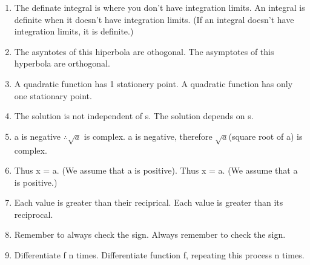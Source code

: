 \documentclass[11pt]{article}
\begin{document}
\begin{enumerate}
	\item
	The definate integral is where you don't have integration limits. \textrightarrow \hspace*{0.25cm} An integral is definite when it doesn't have integration limits.
	(If an integral doesn't have integration limits, it is definite.) 
	\item
	The asyntotes of this hiperbola are othogonal. \textrightarrow \hspace*{0.25cm} The asymptotes of this hyperbola are orthogonal.
	\item
	A quadratic function has 1 stationery point. \textrightarrow \hspace*{0.25cm} A quadratic function has only one stationary point.
	\item
	The solution is not independent of s. \textrightarrow \hspace*{0.25cm} The solution depends on s.
	\item
	a is negative $\therefore\sqrt{a}$ is complex. \textrightarrow \hspace*{0.25cm} a is negative, therefore $\sqrt{a}$(square root of a) is complex. 
	\item
	Thus x = a. (We assume that a is positive). \textrightarrow \hspace*{0.25cm} Thus x = a. (We assume that a is positive.)
	\item
	Each value is greater than their reciprical. \textrightarrow \hspace*{0.25cm} Each value is greater than its reciprocal.
	\item
	Remember to always check the sign. \textrightarrow \hspace*{0.25cm} Always remember to check the sign.
	\item
	Differentiate f n times. \textrightarrow \hspace*{0.25cm}  	Differentiate function f, repeating this process n times. 
\end{enumerate}
\end{document}
